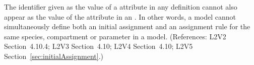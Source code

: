 The identifier given as the value of a 
attribute in any \InitialAssignment definition cannot also appear
as the value of the  attribute in an
\AssignmentRule.  In other words, a model cannot
simultaneously define both an initial assignment and an assignment rule for
the same species, compartment or parameter in a model.
(References: L2V2 Section~4.10.4; L2V3
Section~4.10; L2V4 Section~4.10; L2V5 Section~\ref{sec:initialAssignment}.)

